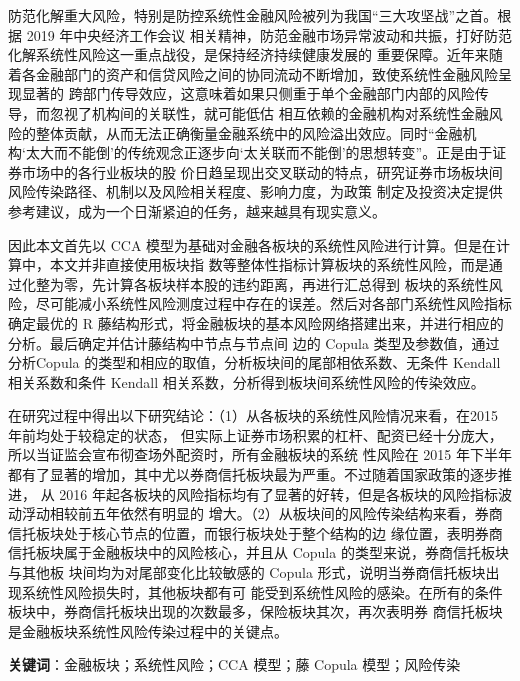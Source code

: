 \begin{cabstract}
  \renewcommand{\chapterlabel}{摘\hspace{2em}要}

 防范化解重大风险，特别是防控系统性金融风险被列为我国“三大攻坚战”之首。根据 2019 年中央经济工作会议
 相关精神，防范金融市场异常波动和共振，打好防范化解系统性风险这一重点战役，是保持经济持续健康发展的
 重要保障。近年来随着各金融部门的资产和信贷风险之间的协同流动不断增加，致使系统性金融风险呈现显著的
 跨部门传导效应，这意味着如果只侧重于单个金融部门内部的风险传导，而忽视了机构间的关联性，就可能低估
 相互依赖的金融机构对系统性金融风险的整体贡献，从而无法正确衡量金融系统中的风险溢出效应。同时“金融机
 构‘太大而不能倒’的传统观念正逐步向‘太关联而不能倒’的思想转变”。正是由于证券市场中的各行业板块的股
 价日趋呈现出交叉联动的特点，研究证券市场板块间风险传染路径、机制以及风险相关程度、影响力度，为政策
 制定及投资决定提供参考建议，成为一个日渐紧迫的任务，越来越具有现实意义。
 
因此本文首先以 CCA 模型为基础对金融各板块的系统性风险进行计算。但是在计算中，本文并非直接使用板块指
数等整体性指标计算板块的系统性风险，而是通过化整为零，先计算各板块样本股的违约距离，再进行汇总得到
板块的系统性风险，尽可能减小系统性风险测度过程中存在的误差。然后对各部门系统性风险指标确定最优的 R
藤结构形式，将金融板块的基本风险网络搭建出来，并进行相应的分析。最后确定并估计藤结构中节点与节点间
边的 Copula 类型及参数值，通过分析Copula 的类型和相应的取值，分析板块间的尾部相依系数、无条件 Kendall
相关系数和条件 Kendall 相关系数，分析得到板块间系统性风险的传染效应。

在研究过程中得出以下研究结论：（1）从各板块的系统性风险情况来看，在2015 年前均处于较稳定的状态，
但实际上证券市场积累的杠杆、配资已经十分庞大，所以当证监会宣布彻查场外配资时，所有金融板块的系统
性风险在 2015 年下半年都有了显著的增加，其中尤以券商信托板块最为严重。不过随着国家政策的逐步推进，
从 2016 年起各板块的风险指标均有了显著的好转，但是各板块的风险指标波动浮动相较前五年依然有明显的
增大。（2）从板块间的风险传染结构来看，券商信托板块处于核心节点的位置，而银行板块处于整个结构的边
缘位置，表明券商信托板块属于金融板块中的风险核心，并且从 Copula 的类型来说，券商信托板块与其他板
块间均为对尾部变化比较敏感的 Copula 形式，说明当券商信托板块出现系统性风险损失时，其他板块都有可
能受到系统性风险的感染。在所有的条件板块中，券商信托板块出现的次数最多，保险板块其次，再次表明券
商信托板块是金融板块系统性风险传染过程中的关键点。
 
  
  \bigbreak

  {\bfseries 关键词}：金融板块；系统性风险；CCA 模型；藤 Copula 模型；风险传染
   
\blankpage
\end{cabstract}




